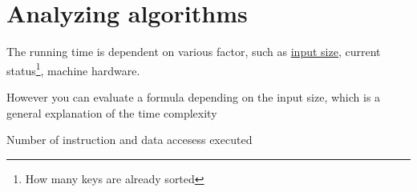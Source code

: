 \section{Analyzing algorithms}

\begin{note}\label{note:running_time_1}
The running time is dependent on various factor, such as \hyperref[def:constant_factor_2]{input size}, current status\footnote{How many keys are already sorted}, machine hardware.

However you can evaluate a formula depending on the input size, which is a general explanation of the time complexity

\end{note}

\begin{definition}\label{def:running_time_1}
    Number of instruction and data accesess executed
\end{definition}

